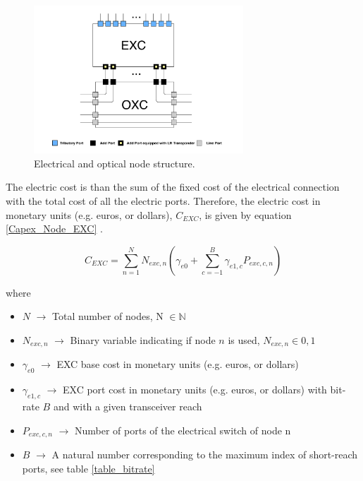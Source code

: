 \begin{figure}[H]
  \begin{center}
    \includegraphics[width=0.7\textwidth]{fig/logos/nodeScheme.pdf}
    \caption{Electrical and optical node structure.}
  \end{center}
  \label{opticalElectricalNode}
\end{figure}


The electric cost is than the sum of the fixed cost of the electrical connection with the total cost of all the electric ports. Therefore, the electric cost in monetary units (e.g. euros, or dollars), $C_{EXC}$, is given by equation \ref{Capex_Node_EXC} \cite{TiagoEsteves}.

\begin{equation}
C_{EXC} = \sum_{n=1}^{N} N_{exc,n} \left( \gamma_{e0} + \sum_{c=-1}^B \gamma_{e1,c} P_{exc,c,n} \right)
\label{Capex_Node_EXC}
\end{equation}

\noindent
where
\begin{itemize}
\item{$N$				$\rightarrow$	Total number of nodes, N $\in \mathbb{N}$}
\item{$N_{exc,n}$		$\rightarrow$	Binary variable indicating if node $n$ is used, $N_{exc,n} \in {0, 1}$}
\item{$\gamma_{e0}$ 	$\rightarrow$	EXC base cost in monetary units (e.g. euros, or dollars)}
\item{$\gamma_{e1,c}$	$\rightarrow$	EXC port cost in monetary units (e.g. euros, or dollars) with bit-rate $B$ and with a given transceiver reach}
\item{$P_{exc,c,n}$	    $\rightarrow$	Number of ports of the electrical switch of node n}
\item{$B$           	$\rightarrow$	A natural number corresponding to the maximum index of short-reach ports, see table \ref{table_bitrate}}
\end{itemize}

